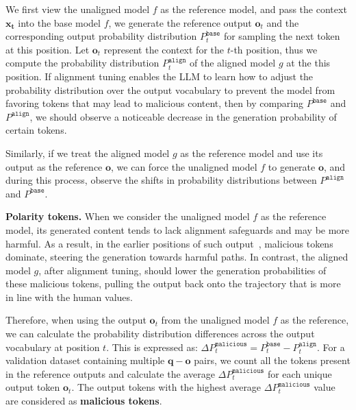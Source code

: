 We first view the unaligned model $f$ as the reference model, and pass the context $\mathbf{x_{t}}$ into the base model $f$, we generate the reference output $\mathbf{o}_{t}$ and the corresponding output probability distribution $P^{\texttt{base}}_{t}$ for sampling the next token at this position. 
%
Let $\mathbf{o}_{t}$ represent the context for the $t$-th position, thus we compute the probability distribution $P^{\texttt{align}}_{t}$ of the aligned model $g$ at the this position.
If alignment tuning enables the LLM to learn how to adjust the probability distribution over the output vocabulary to prevent the model from favoring tokens that may lead to malicious content, then by comparing $P^{\texttt{base}}$ and $P^{\texttt{align}}$, we should observe a noticeable decrease in the generation probability of certain tokens.

Similarly, if we treat the aligned model $g$ as the reference model and use its output as the reference $\mathbf{o}$, we can force the unaligned model $f$ to generate $\mathbf{o}$, and during this process, observe the shifts in probability distributions between $P^{\texttt{align}}$ and $P^{\texttt{base}}$.

\noindent\textbf{Polarity tokens.}
When we consider the unaligned model $f$ as the reference model, its generated content tends to lack alignment safeguards and may be more harmful. 
As a result, in the earlier positions of such output~\citep{DBLP:journals/corr/abs-2406-05946}, malicious tokens dominate, steering the generation towards harmful paths. 
In contrast, the aligned model $g$, after alignment tuning, should lower the generation probabilities of these malicious tokens, pulling the output back onto the trajectory that is more in line with the human values.

Therefore, when using the output $\mathbf{o}_{t}$ from the unaligned model $f$ as the reference, we can calculate the probability distribution differences across the output vocabulary at position $t$. 
This is expressed as: $\Delta P^{\texttt{malicious}}_{t} = P^{\texttt{base}}_{t} - P^{\texttt{align}}_{t}$.
For a validation dataset containing multiple $\mathbf{q} - \mathbf{o}$ pairs, we count all the tokens present in the reference outputs and calculate the average $\Delta P^{\texttt{malicious}}_{t}$ for each unique output token $\mathbf{o}_{t}$. 
The output tokens with the highest average $\Delta P^{\texttt{malicious}}_{t}$ value are considered as \textbf{\color{myred} malicious tokens}.

